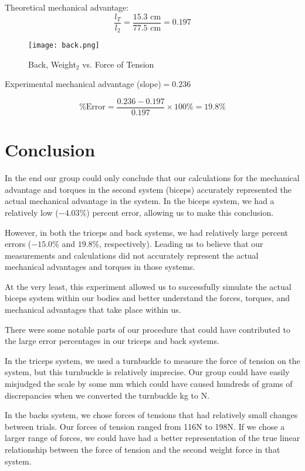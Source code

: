 \documentclass[fleqn]{article}
\begin{document}
Theoretical mechanical advantage:
\[ \frac{l_T}{l_2} = \frac{15.3 \text{ cm} }{77.5 \text{ cm} } = 0.197  \]

\begin{figure}[H]
	\caption*{Back, Weight$_{2}$ vs. Force of Tension}
	\texttt{[image: back.png]}
\end{figure}

Experimental mechanical advantage (slope)$=0.236$

\[ \text{\% Error} = \frac{0.236 - 0.197}{0.197} \times 100 \% = 19.8\%\]

\section*{Conclusion}

In the end our group could only conclude that our calculations for the mechanical advantage and torques in the second system (biceps) accurately represented the actual mechanical advantage in the system. In the biceps system, we had a relatively low ($-4.03\%$) percent error, allowing us to make this conclusion.

However, in both the triceps and back systems, we had relatively large percent errors ($-15.0\%$ and $19.8\%$, respectively). Leading us to believe that our measurements and calculations did not accurately represent the actual mechanical advantages and torques in those systems.

At the very least, this experiment allowed us to successfully simulate the actual biceps system within our bodies and better understand the forces, torques, and mechanical advantages that take place within us.

There were some notable parts of our procedure that could have contributed to the large error percentages in our triceps and back systems.

In the triceps system, we used a turnbuckle to measure the force of tension on the system, but this turnbuckle is relatively imprecise. Our group could have easily misjudged the scale by some mm which could have caused hundreds of grams of discrepancies when we converted the turnbuckle kg to N.

In the backs system, we chose forces of tensions that had relatively small changes between trials. Our forces of tension ranged from 116N to 198N. If we chose a larger range of forces, we could have had a better representation of the true linear relationship between the force of tension and the second weight force in that system.
\end{document}
